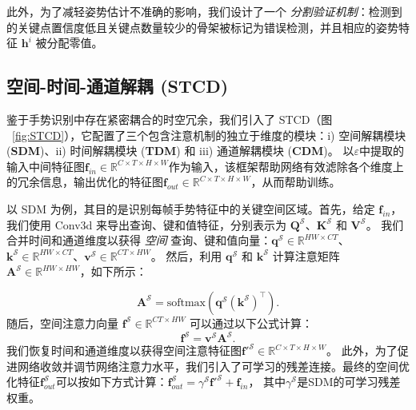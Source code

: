 此外，为了减轻姿势估计不准确的影响，我们设计了一个 \emph{分割验证机制}：检测到的关键点置信度低且关键点数量较少的骨架被标记为错误检测，并且相应的姿势特征 $\mathbf{h}^{i}$ 被分配零值。%

\subsection{空间-时间-通道解耦 (STCD)}
\label{sec:STCD}
鉴于手势识别中存在紧密耦合的时空冗余\cite{zhou2023unified}，我们引入了 STCD（图 ~\ref{fig:STCD}），它配置了三个包含注意机制的独立于维度的模块：i) 空间解耦模块 (\textbf{SDM})、ii) 时间解耦模块 (\textbf{TDM}) 和 iii) 通道解耦模块 (\textbf{CDM})。
以$\varepsilon$中提取的输入中间特征图$\mathbf{f}_{in}\in \mathbb{R}^{C\times T\times H\times W}$作为输入，该框架帮助网络有效滤除各个维度上的冗余信息，输出优化的特征图$\mathbf{f}_{out}\in \mathbb{R}^{C\times T\times H\times W}$，从而帮助训练。

以 SDM 为例，其目的是识别每帧手势特征中的关键空间区域。首先，给定 $\mathbf{f}_{in}$，我们使用 Conv3d 来导出查询、键和值特征，分别表示为 $\mathbf{Q}^{\mathcal{S}}$、$\mathbf{K}^{\mathcal{S}}$ 和 $\mathbf{V}^{\mathcal{S}}$。
我们合并时间和通道维度以获得 \emph{空间} 查询、键和值向量：$\mathbf{q}^{\mathcal{S}}\in \mathbb{R}^{HW\times CT}$、$\mathbf{k}^{\mathcal{S}}\in \mathbb{R}^{HW\times CT}$、$\mathbf{v}^{\mathcal{S}}\in \mathbb{R}^{CT\times HW}$。
然后，利用 $\mathbf{q}^{\mathcal{S}}$ 和 $\mathbf{k}^{\mathcal{S}}$ 计算注意矩阵 $\mathbf{A}^{\mathcal{S}}\in \mathbb{R}^{HW\times HW}$，如下所示：

\begin{equation}
\mathbf{A}^{\mathcal{S}} = \text{softmax}\left(\mathbf{q}^{\mathcal{S}}\left(\mathbf{k}^{\mathcal{S}}\right)^{\top}\right).
\end{equation}
随后，空间注意力向量 $\mathbf{f}^{\mathcal{S}}\in \mathbb{R}^{CT\times HW}$ 可以通过以下公式计算：
\begin{equation}
\mathbf{f}^{\mathcal{S}} = \mathbf{v}^{\mathcal{S}} \mathbf{A}^{\mathcal{S}}.
\end{equation}
我们恢复时间和通道维度以获得空间注意特征图$\mathbf{f}'^{\mathcal{S}}\in \mathbb{R}^{C\times T\times H\times W}$。
此外，为了促进网络收敛并调节网络注意力水平，我们引入了可学习的残差连接。最终的空间优化特征$\mathbf{f}_{out}^{\mathcal{S}}$可以按如下方式计算：$\mathbf{f}_{out}^{\mathcal{S}} = \gamma^{\mathcal{S}} \mathbf{f}'^{\mathcal{S}} + \mathbf{f}_{in}$，
其中$\gamma^{\mathcal{S}}$是SDM的可学习残差权重。

